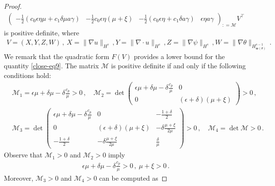 \documentclass[reqno,11pt]{amsart}
\numberwithin{equation}{section}
\def\w{\mathfrak{w}}
\begin{document}
\begin{proof}
\begin{equation*}
\begin{aligned}
{\begin{pmatrix}
- \frac{1}{2} (c_0 \epsilon \eta \mu + c_1 \delta \mu a \gamma) & - \frac{1}{2} c_0 \epsilon \eta (\mu + \xi) & - \frac{1}{2} (c_0 \epsilon \eta + c_1 \delta a \gamma) & \epsilon \eta a \gamma
\end{pmatrix}}_{: = \mathcal{M}}
V^\top
\end{aligned}
\end{equation*}
is positive definite, where
\begin{equation*}
  \begin{aligned}
    V = (X, Y, Z, W) \,, \ X = \| \nabla u \|_{H^s} \,, Y = \| \nabla \cdot u \|_{H^s} \,, Z = \| \nabla \psi \|_{H^s} \,, W = \| \nabla \theta \|_{H^{s-1}_{ \w (\theta) }} \,.
  \end{aligned}
\end{equation*}
We remark that the quadratic form $F(V)$ provides a lower bound for the quantity \eqref{close-eq9}. The matrix $\mathcal{M}$ is positive definite if and only if the following conditions hold:
  \begin{equation}\label{M1234}
    \begin{aligned}
      & \mathcal{M}_1 = \epsilon \mu + \delta \mu - \delta \frac{c_p}{\mu} > 0 \,, \quad \mathcal{M}_2 = \det \begin{pmatrix}
\epsilon \mu + \delta \mu - \delta \frac{c_p}{\mu} & 0 \\
0 & (\epsilon + \delta) (\mu + \xi)
\end{pmatrix} > 0 \,, \\
      & \mathcal{M}_3 = \det \begin{pmatrix}
\epsilon \mu + \delta \mu - \delta \frac{c_p}{\mu} & 0 & - \frac{1 + \delta}{2} \\
0 & (\epsilon + \delta) (\mu + \xi) & - \delta \frac{\mu + \xi}{2 \mu} \\
- \frac{1 + \delta}{2} & - \delta \frac{\mu + \xi}{2 \mu} & \frac{\delta}{\mu} 
\end{pmatrix} > 0 \,, \quad \mathcal{M}_4 = \det \mathcal{M} > 0 \,.
    \end{aligned}
  \end{equation}
Observe that $\mathcal{M}_1 > 0$ and $\mathcal{M}_2 > 0$ imply
\begin{equation}\label{M12}
  \begin{aligned}
    \epsilon \mu + \delta \mu - \delta \frac{c_p}{\mu} > 0 \,, \ \mu + \xi > 0 \,.
  \end{aligned}
\end{equation}
Moreover, $\mathcal{M}_3 > 0$ and $\mathcal{M}_4 > 0$ can be computed as

\end{proof}
\end{document}

